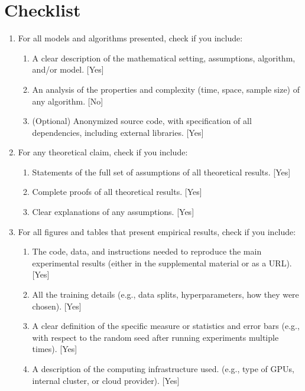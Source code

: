 \clearpage
\section*{Checklist}

 \begin{enumerate}


 \item For all models and algorithms presented, check if you include:
 \begin{enumerate}
   \item A clear description of the mathematical setting, assumptions, algorithm, and/or model. [Yes]
   \item An analysis of the properties and complexity (time, space, sample size) of any algorithm. [No]
   \item (Optional) Anonymized source code, with specification of all dependencies, including external libraries. [Yes]
 \end{enumerate}


 \item For any theoretical claim, check if you include:
 \begin{enumerate}
   \item Statements of the full set of assumptions of all theoretical results. [Yes]
   \item Complete proofs of all theoretical results. [Yes]
   \item Clear explanations of any assumptions. [Yes]     
 \end{enumerate}


 \item For all figures and tables that present empirical results, check if you include:
 \begin{enumerate}
   \item The code, data, and instructions needed to reproduce the main experimental results (either in the supplemental material or as a URL). [Yes]
   \item All the training details (e.g., data splits, hyperparameters, how they were chosen). [Yes]
   \item A clear definition of the specific measure or statistics and error bars (e.g., with respect to the random seed after running experiments multiple times). [Yes]
   \item A description of the computing infrastructure used. (e.g., type of GPUs, internal cluster, or cloud provider). [Yes]
 \end{enumerate}


\end{enumerate}
